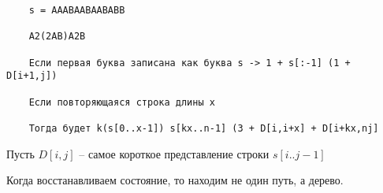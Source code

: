 \documentclass{book}
\theoremstyle{definition}
\begin{document}
\begin{verbatim}
    s = AAABAABAABABB

    A2(2AB)A2B

    Если первая буква записана как буква s -> 1 + s[:-1] (1 + D[i+1,j])

    Если повторяющаяся строка длины x

    Тогда будет k(s[0..x-1]) s[kx..n-1] (3 + D[i,i+x] + D[i+kx,nj]
\end{verbatim}

Пусть $D[i,j]$ -- самое короткое представление строки  $s[i..j-1]$

Когда восстанавливаем состояние, то находим не один путь, а дерево.
\end{document}
